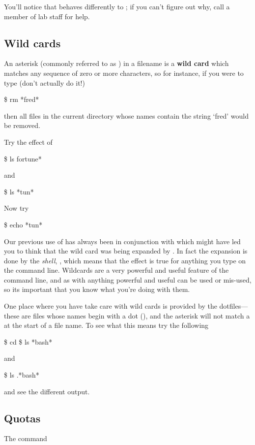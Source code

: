 You'll notice that  behaves differently to ; if you can't figure out why, call a member of lab staff for help. 

\subsection{Wild cards}
An asterisk (commonly referred to as ) in a filename is a \textbf{wild card} which matches any sequence of
zero or more characters, so for instance, if you were to type (don't
actually do it!)
%
\begin{ttoutenv}
\$  rm *fred*\return
\end{ttoutenv}
%
then all files in the current directory whose names contain the string
`fred' would be removed.

Try the effect of
%
\begin{ttoutenv}
\$  ls fortune*\return
\end{ttoutenv}
%
and
%
\begin{ttoutenv}
\$  ls *tun*\return
\end{ttoutenv}

Now try
%
\begin{ttoutenv}
\$  echo *tun*\return
\end{ttoutenv}
%
Our previous use of \ttout{*} has always been in conjunction with  which might have led you to think that the wild card was being expanded by . In fact the expansion is done by the \emph{shell}, , which means that the effect is true for anything you type on the command line. Wildcards are a very powerful and useful feature of the command line, and as with anything powerful and useful can be used or mis-used, so its important that you know what you're doing with them.

One place where you have take care with wild cards is provided by the dotfiles---these are files
whose names begin with a dot (), and the asterisk will not match a
 at the start of a file name. To see what this means try the
following
\begin{ttoutenv}
\$  cd \return
\$  ls *bash* \return
\end{ttoutenv}
%
and
%
\begin{ttoutenv}
\$  ls .*bash*\return
\end{ttoutenv}
and see the different output.

\subsection{Quotas}
The command

